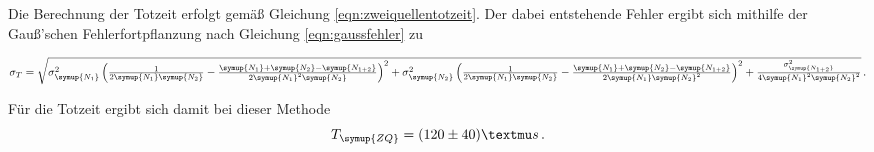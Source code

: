 Die Berechnung der Totzeit erfolgt gemäß Gleichung \eqref{eqn:zweiquellentotzeit}.
Der dabei entstehende Fehler ergibt sich mithilfe der Gauß'schen Fehlerfortpflanzung
nach Gleichung \eqref{eqn:gaussfehler} zu
\begin{center}
  $\sigma_T = \sqrt{\sigma_{\symup{N_1}}^{2} \left(\frac{1}{2 \symup{N_1} \symup{N_2}}
  - \frac{\symup{N_1} + \symup{N_2} - \symup{N_{1+2}}}{2 \symup{N_1}^{2} \symup{N_2}}\right)^{2}
  + \sigma_{\symup{N_2}}^{2} \left(\frac{1}{2 \symup{N_1} \symup{N_2}}
  - \frac{\symup{N_1} + \symup{N_2} - \symup{N_{1+2}}}{2 \symup{N_1} \symup{N_2}^{2}}\right)^{2}
  + \frac{\sigma_{\symup{N_{1+2}}}^{2}}{4 \symup{N_1}^{2} \symup{N_2}^{2}}} \,.$
\end{center}
Für die Totzeit ergibt sich damit bei dieser Methode
\begin{equation*}
  T_{\symup{ZQ}}= (120 \pm 40)µs \,.
\end{equation*}

